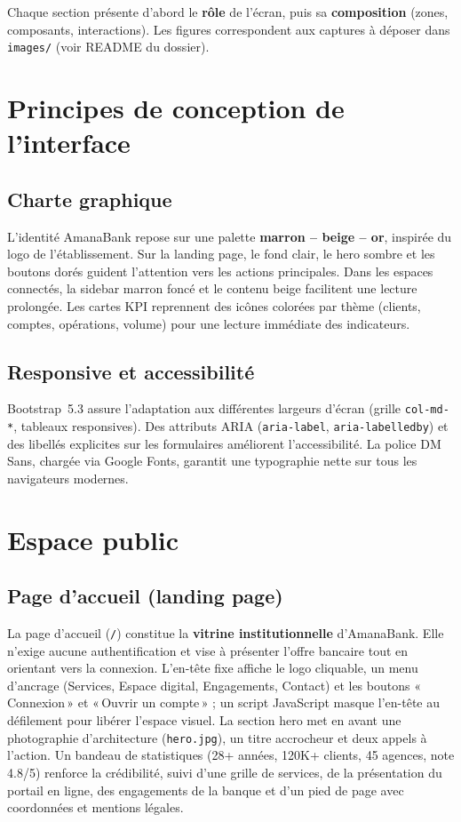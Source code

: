 \documentclass[11pt,a4paper,oneside]{report}
\begin{document}
Chaque section présente d'abord le \textbf{rôle} de l'écran, puis sa \textbf{composition} (zones, composants, interactions). Les figures correspondent aux captures à déposer dans \texttt{images/} (voir README du dossier).

\section{Principes de conception de l'interface}

\subsection{Charte graphique}

L'identité AmanaBank repose sur une palette \textbf{marron -- beige -- or}, inspirée du logo de l'établissement. Sur la landing page, le fond clair, le hero sombre et les boutons dorés guident l'attention vers les actions principales. Dans les espaces connectés, la sidebar marron foncé et le contenu beige facilitent une lecture prolongée. Les cartes KPI reprennent des icônes colorées par thème (clients, comptes, opérations, volume) pour une lecture immédiate des indicateurs.

\subsection{Responsive et accessibilité}

Bootstrap~5.3 assure l'adaptation aux différentes largeurs d'écran (grille \texttt{col-md-*}, tableaux responsives). Des attributs ARIA (\texttt{aria-label}, \texttt{aria-labelledby}) et des libellés explicites sur les formulaires améliorent l'accessibilité. La police DM Sans, chargée via Google Fonts, garantit une typographie nette sur tous les navigateurs modernes.

\section{Espace public}

\subsection{Page d'accueil (landing page)}

La page d'accueil (\texttt{/}) constitue la \textbf{vitrine institutionnelle} d'AmanaBank. Elle n'exige aucune authentification et vise à présenter l'offre bancaire tout en orientant vers la connexion. L'en-tête fixe affiche le logo cliquable, un menu d'ancrage (Services, Espace digital, Engagements, Contact) et les boutons «\,Connexion\,» et «\,Ouvrir un compte\,» ; un script JavaScript masque l'en-tête au défilement pour libérer l'espace visuel. La section hero met en avant une photographie d'architecture (\texttt{hero.jpg}), un titre accrocheur et deux appels à l'action. Un bandeau de statistiques (28+ années, 120K+ clients, 45 agences, note 4.8/5) renforce la crédibilité, suivi d'une grille de services, de la présentation du portail en ligne, des engagements de la banque et d'un pied de page avec coordonnées et mentions légales.
\end{document}
